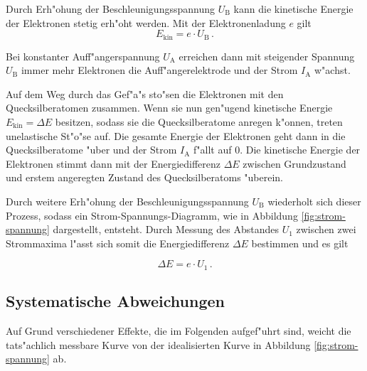 	Durch Erh"ohung der Beschleunigungsspannung $U_\mathrm{B}$ kann die kinetische Energie der Elektronen stetig erh"oht werden. Mit der Elektronenladung $e$ gilt
	\begin{equation}
		E_\mathrm{kin} = e \cdot U_\mathrm{B} \,.
	\end{equation}

	Bei konstanter Auff"angerspannung $U_\mathrm{A}$ erreichen dann mit steigender Spannung $U_\mathrm{B}$ immer mehr Elektronen die Auff"angerelektrode und der Strom $I_\mathrm{A}$ w"achst.

	Auf dem Weg durch das Gef"a"s sto"sen die Elektronen mit den Quecksilberatomen zusammen.
	Wenn sie nun gen"ugend kinetische Energie $E_\mathrm{kin} = \Delta E$ besitzen, sodass sie die Quecksilberatome anregen k"onnen, treten unelastische St"o"se auf.
	Die gesamte Energie der Elektronen geht dann in die Quecksilberatome "uber und der Strom $I_\mathrm{A}$ f"allt auf 0.
	Die kinetische Energie der Elektronen stimmt dann mit der Energiedifferenz $\Delta E$ zwischen Grundzustand und erstem angeregten Zustand des Quecksilberatoms "uberein.

	Durch weitere Erh"ohung der Beschleunigungsspannung $U_\mathrm{B}$ wiederholt sich dieser Prozess, sodass ein Strom-Spannungs-Diagramm, wie in Abbildung \ref{fig:strom-spannung} dargestellt, entsteht.
	Durch Messung des Abstandes $U_1$ zwischen zwei Strommaxima l"asst sich somit die Energiedifferenz $\Delta E$ bestimmen und es gilt

	\begin{equation}
		\Delta E = e \cdot U_1 \,.
	\end{equation}

	\subsection{Systematische Abweichungen}
	\label{subsec:abweichungen}
		Auf Grund verschiedener Effekte, die im Folgenden aufgef"uhrt sind, weicht die tats"achlich messbare Kurve von der idealisierten Kurve in Abbildung \ref{fig:strom-spannung} ab.

